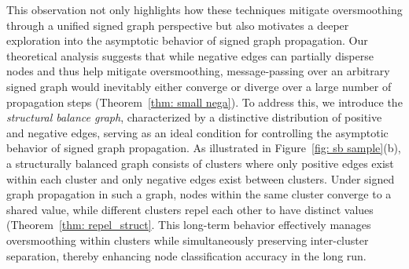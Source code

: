 This observation not only highlights how these techniques mitigate oversmoothing through a unified signed graph perspective but also motivates a deeper exploration into the asymptotic behavior of signed graph propagation.
Our theoretical analysis suggests that while negative edges can partially disperse nodes and thus help mitigate oversmoothing, message-passing over an arbitrary signed graph would inevitably either converge or diverge over a large number of propagation steps (Theorem~\ref{thm: small nega}). 
To address this, we introduce the \textit{structural balance graph}, characterized by a distinctive distribution of positive and negative edges, serving as an ideal condition for controlling the asymptotic behavior of signed graph propagation.
As illustrated in Figure~\ref{fig: sb sample}(b),
a structurally balanced graph consists of clusters where only positive edges exist within each cluster and only negative edges exist between clusters. 
Under signed graph propagation in such a graph,  nodes within the same cluster converge to a shared value, while different clusters repel each other to have distinct values (Theorem~\ref{thm: repel_struct}. This long-term behavior effectively manages oversmoothing within clusters while simultaneously preserving inter-cluster separation, thereby enhancing node classification accuracy in the long run.




